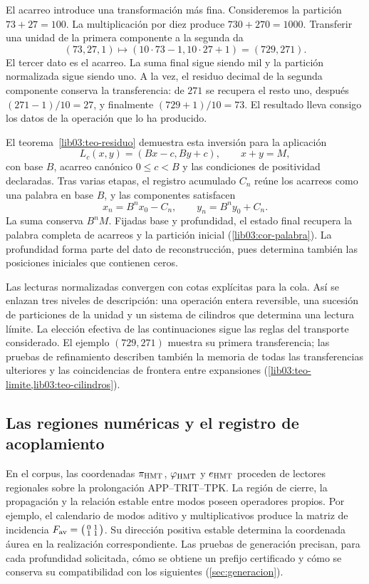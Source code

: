 El acarreo introduce una transformación más fina. Consideremos la
partición \(73+27=100\). La multiplicación por diez produce
\(730+270=1000\). Transferir una unidad de la primera componente a
la segunda da
\[
 (73,27,1)\longmapsto(10\cdot73-1,10\cdot27+1)
                  =(729,271).
\]
El tercer dato es el acarreo. La suma final sigue siendo mil y la
partición normalizada sigue siendo uno. A la vez, el residuo decimal
de la segunda componente conserva la transferencia: de \(271\) se
recupera el resto uno, después \((271-1)/10=27\), y finalmente
\((729+1)/10=73\). El resultado lleva consigo los datos de la
operación que lo ha producido.

El teorema~\ref{lib03:teo-residuo} demuestra esta inversión para la aplicación
\[
 L_c(x,y)=(Bx-c,By+c),\qquad x+y=M,
\]
con base \(B\), acarreo canónico \(0\leq c<B\) y las condiciones
de positividad declaradas. Tras varias etapas, el registro acumulado
\(C_n\) reúne los acarreos como una palabra en base \(B\), y las
componentes satisfacen
\[
 x_n=B^n x_0-C_n,\qquad y_n=B^n y_0+C_n.
\]
La suma conserva \(B^nM\). Fijadas base y profundidad, el estado
final recupera la palabra completa de acarreos y la partición inicial
(\cref{lib03:cor-palabra}). La profundidad forma parte del dato de
reconstrucción, pues determina también las posiciones iniciales que
contienen ceros.

Las lecturas normalizadas convergen con cotas explícitas para la cola.
Así se enlazan tres niveles de descripción: una operación entera
reversible, una sucesión de particiones de la unidad y un sistema de
cilindros que determina una lectura límite. La elección efectiva de las
continuaciones sigue las reglas del transporte considerado. El ejemplo
\((729,271)\) muestra su primera transferencia; las pruebas de
refinamiento describen también la memoria de todas las transferencias
ulteriores y las coincidencias de frontera entre expansiones
(\cref{lib03:teo-limite,lib03:teo-cilindros}).

\subsection*{Las regiones numéricas y el registro de acoplamiento}
\label{libnar:registro}

En el corpus, las coordenadas \(\pi_{\rm HMT}\),
\(\varphi_{\rm HMT}\) y \(e_{\rm HMT}\) proceden de lectores
regionales sobre la prolongación APP--TRIT--TPK. La región de cierre,
la propagación y la relación estable entre modos poseen operadores
propios. Por ejemplo, el calendario de modos aditivo y multiplicativos
produce la matriz de incidencia
\(F_{\rm av}=\bigl(\begin{smallmatrix}0&1\\1&1\end{smallmatrix}\bigr)\).
Su dirección positiva estable determina la coordenada áurea en la
realización correspondiente. Las pruebas de generación precisan, para
cada profundidad solicitada, cómo se obtiene un prefijo certificado y
cómo se conserva su compatibilidad con los siguientes
(\cref{sec:generacion}).

